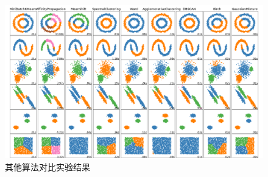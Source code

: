 \documentclass{article}
\begin{document}
\begin{figure}[ht]

  \includegraphics[width=5in]{test}
  \caption{其他算法对比实验结果}\label{aa}
\end{figure}
\end{document}
